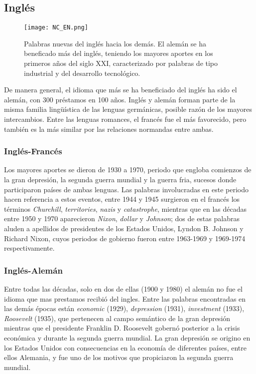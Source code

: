 {


\subsection{Inglés} %

\begin{figure} %
	\centering
	\texttt{[image: NC\_EN.png]}
	\label{fig.NC_EN}
	\caption{Palabras nuevas del inglés hacia los demás. El alemán se ha beneficado más del inglés, teniendo los mayores aportes en los primeros años del siglo XXI, caracterizado por palabras de tipo industrial y del desarrollo tecnológico.}
\end{figure} %

De manera general, el idioma que más se ha beneficiado del inglés ha sido el
alemán, con 300 préstamos en 100 años.  Inglés y alemán forman parte de la
misma familia lingüística de las lenguas germánicas,  posible razón de los
mayores intercambios. Entre las lenguas romances, el francés fue el más
favorecido, pero también es la más similar por las relaciones normandas entre
ambas.
\subsubsection*{Inglés-Francés} %

Los mayores aportes se dieron de 1930 a 1970, periodo que engloba comienzos de
la gran depresión, la segunda guerra mundial y la guerra fria, sucesos donde
participaron países de ambas lenguas. Las palabras involucradas en este periodo
hacen referencia a estos eventos, entre 1944 y 1945 surgieron en el francés los
términos \textit{Churchill}, \textit{territories}, \textit{nazis} y
\textit{catastrophe},  mientras que en las décadas entre 1950 y 1970
aparecieron \textit{Nixon}, \textit{dollar} y \textit{Johnson}; dos de estas
palabras aluden a apellidos de presidentes de los Estados Unidos,  Lyndon B.
Johnson y Richard Nixon, cuyos periodos de gobierno fueron  entre 1963-1969 y
1969-1974 respectivamente.
\subsubsection*{Inglés-Alemán} %
Entre todas las décadas, solo en dos de ellas (1900  y 1980) el alemán no fue
el idioma que mas prestamos recibió  del ingles. Entre las palabras encontradas
en las demás épocas están \textit{economic} (1929), \textit{depression} (1931),
\textit{investment} (1933), \textit{Roosevelt} (1935), que pertenecen al campo
semántico de la gran depresión mientras que el presidente Franklin D. Roosevelt
gobernó posterior a la crisis económica y durante la segunda guerra mundial. La
gran depresión se origino en los Estados Unidos con consecuencias en la
economía de diferentes países, entre ellos  Alemania, y fue uno de los motivos
que propiciaron la segunda guerra mundial.

}
